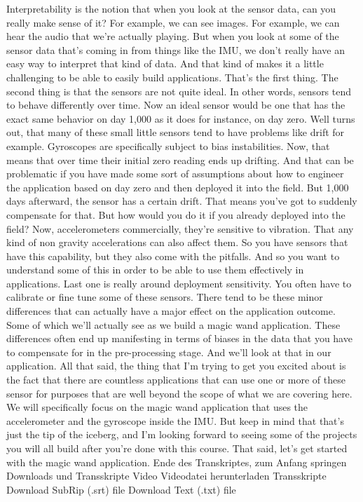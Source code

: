     Interpretability is the notion that when you look at the sensor data,
    can you really make sense of it?
    For example, we can see images.
    For example, we can hear the audio that we're actually playing.
    But when you look at some of the sensor data that's
    coming in from things like the IMU, we don't really
    have an easy way to interpret that kind of data.
    And that kind of makes it a little challenging
    to be able to easily build applications.
    That's the first thing.
    The second thing is that the sensors are not quite ideal.
    In other words, sensors tend to behave differently over time.
    Now an ideal sensor would be one that has
    the exact same behavior on day 1,000 as it does for instance, on day zero.
    Well turns out, that many of these small little sensors
    tend to have problems like drift for example.
    Gyroscopes are specifically subject to bias instabilities.
    Now, that means that over time their initial zero reading ends up drifting.
    And that can be problematic if you have made some sort of assumptions about how
    to engineer the application based on day zero
    and then deployed it into the field.
    But 1,000 days afterward, the sensor has a certain drift.
    That means you've got to suddenly compensate for that.
    But how would you do it if you already deployed into the field?
    Now, accelerometers commercially, they're sensitive to vibration.
    That any kind of non gravity accelerations can also affect them.
    So you have sensors that have this capability,
    but they also come with the pitfalls.
    And so you want to understand some of this in order
    to be able to use them effectively in applications.
    Last one is really around deployment sensitivity.
    You often have to calibrate or fine tune some of these sensors.
    There tend to be these minor differences that
    can actually have a major effect on the application outcome.
    Some of which we'll actually see as we build a magic wand application.
    These differences often end up manifesting
    in terms of biases in the data that you have to compensate
    for in the pre-processing stage.
    And we'll look at that in our application.
    All that said, the thing that I'm trying to get you excited about
    is the fact that there are countless applications that can use one or more
    of these sensor for purposes that are well beyond the scope of what
    we are covering here.
    We will specifically focus on the magic wand application
    that uses the accelerometer and the gyroscope inside the IMU.
    But keep in mind that that's just the tip of the iceberg,
    and I'm looking forward to seeing some of the projects you will all build
    after you're done with this course.
    That said, let's get started with the magic wand application.
    Ende des Transkriptes, zum Anfang springen
    Downloads und Transskripte
    Video
    Videodatei herunterladen
    Transskripte
    Download SubRip (.srt) file
    Download Text (.txt) file

